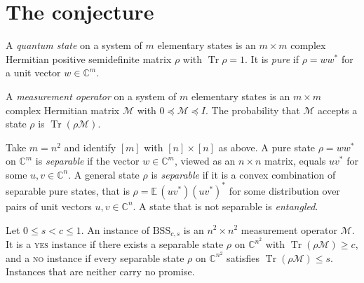 \documentclass{aicr-conjecture}
\newcommand{\BSS}{\mathrm{BSS}}
\newcommand{\Tr}{\operatorname{Tr}}
\newcommand{\CC}{\mathbb{C}}
\begin{document}
\section{The conjecture}\label{sec:conjectures}

\begin{definition}\label{def:state}
A \emph{quantum state} on a system of $m$ elementary states is an
$m \times m$ complex Hermitian positive semidefinite matrix $\rho$ with
$\Tr \rho = 1$. It is \emph{pure} if $\rho = w w^{*}$ for a unit vector
$w \in \CC^{m}$.
\end{definition}

\begin{definition}\label{def:meas}
A \emph{measurement operator} on a system of $m$ elementary states is an
$m \times m$ complex Hermitian matrix $\mathcal{M}$ with
$0 \preceq \mathcal{M} \preceq I$. The probability that $\mathcal{M}$
accepts a state $\rho$ is $\Tr(\rho \mathcal{M})$.
\end{definition}

\begin{definition}\label{def:sep}
Take $m = n^{2}$ and identify $[m]$ with $[n] \times [n]$ as above. A
pure state $\rho = w w^{*}$ on $\CC^{m}$ is \emph{separable} if the
vector $w \in \CC^{m}$, viewed as an $n \times n$ matrix, equals
$u v^{*}$ for some $u, v \in \CC^{n}$. A general state $\rho$ is
\emph{separable} if it is a convex combination of separable pure states,
that is $\rho = \mathbb{E}\,(u v^{*})(u v^{*})^{*}$ for some
distribution over pairs of unit vectors $u, v \in \CC^{n}$. A state that
is not separable is \emph{entangled}.
\end{definition}

\begin{definition}[The promise problem $\BSS_{c,s}$]\label{def:bss}
Let $0 \le s < c \le 1$. An instance of $\BSS_{c,s}$ is an
$n^{2} \times n^{2}$ measurement operator $\mathcal{M}$. It is a
\textsc{yes} instance if there exists a separable state $\rho$ on
$\CC^{n^{2}}$ with $\Tr(\rho \mathcal{M}) \ge c$, and a \textsc{no}
instance if every separable state $\rho$ on $\CC^{n^{2}}$ satisfies
$\Tr(\rho \mathcal{M}) \le s$. Instances that are neither carry no
promise.
\end{definition}
\end{document}
